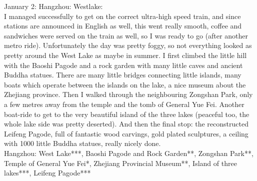 January 2: Hangzhou: Westlake:\\
I managed successfully to get on the correct ultra-high speed train, and since stations are announced in English as well, this went really smooth, coffee and sandwiches were served on the train as well, so I was ready to go (after another metro ride). Unfortunately the day was pretty foggy, so not everything looked as pretty around the West Lake as maybe in summer. I first climbed the little hill with the Baoshi Pagode and a rock garden with many little caves and ancient Buddha statues. There are many little bridges connecting little islands, many boats which operate between the islands on the lake, a nice museum about the Zhejiang province. Then I walked through the neighbouring Zongshan Park, only a few metres away from the temple and the tomb of General Yue Fei. Another boat-ride to get to the very beautiful island of the three lakes (peaceful too, the whole lake side was pretty deserted). And then the final stop: the reconstructed Leifeng Pagode, full of fantastic wood carvings, gold plated sculptures, a ceiling with 1000 little Buddha statues, really nicely done.\\

Hangzhou: West Lake***, Baoshi Pagode and Rock Garden**, Zongshan Park**, Temple of General Yue Fei*, Zhejiang Provincial Museum**, Island of three lakes***, Leifeng Pagode***\\

